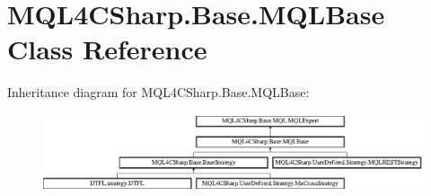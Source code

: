 \hypertarget{class_m_q_l4_c_sharp_1_1_base_1_1_m_q_l_base}{}\section{M\+Q\+L4\+C\+Sharp.\+Base.\+M\+Q\+L\+Base Class Reference}
\label{class_m_q_l4_c_sharp_1_1_base_1_1_m_q_l_base}
Inheritance diagram for M\+Q\+L4\+C\+Sharp.\+Base.\+M\+Q\+L\+Base\+:\begin{figure}[H]
\begin{center}
\leavevmode
\includegraphics[height=2.242242cm]{class_m_q_l4_c_sharp_1_1_base_1_1_m_q_l_base}
\end{center}
\end{figure}
